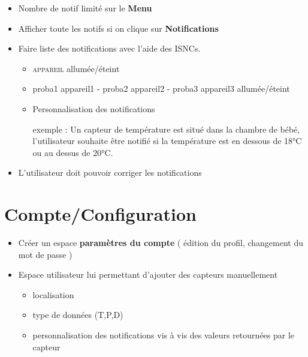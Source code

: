 \documentclass[10pt,a4paper]{article}
\begin{document}
\begin{itemize}[label=$\bullet$]
\setlength\itemsep{1em}
    \item Nombre de notif limité sur le \textbf{Menu}
    
    \item Afficher toute les notifs si on clique sur \textbf{Notifications}
    
    \item Faire liste des notifications avec l'aide des ISNCs.
        \begin{itemize}[label=$\circ$]
            \item \textsc{appareil} allumée/éteint
        	\item proba1 appareil1 - proba2 appareil2 - proba3 appareil3 allumée/éteint
        	\item Personnalisation des notifications 
        	
        	exemple : Un capteur de température est situé dans la chambre de bébé, l'utilisateur souhaite être notifié si la température est en dessous de 18°C ou au dessus de 20°C.
        \end{itemize}
        
    \item L'utilisateur doit pouvoir corriger les notifications 
\end{itemize}
\section{Compte/Configuration}

\begin{itemize}[label=$\bullet$]
\setlength\itemsep{1em}
\item Créer un espace \textbf{paramètres du compte} ( édition du profil, changement du mot de passe )

\item Espace utilisateur lui permettant d'ajouter des capteurs manuellement
    \begin{itemize}[label=$\circ$]
        \item localisation
        \item type de données (T,P,D)
        \item personnalisation des notifications vis à vis des valeurs retournées par le capteur
    \end{itemize}
\end{itemize}
\end{document}
